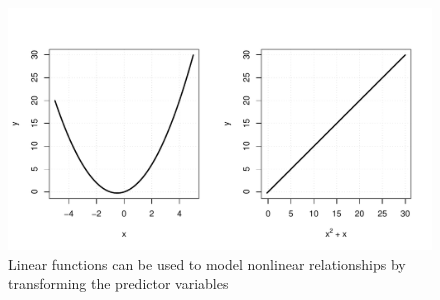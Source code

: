 \documentclass[11pt,a4paper,article]{memoir} %
\begin{document}
  \begin{figure}
  \includegraphics[width=\textwidth]{nonlinear_to_linear.pdf}
  \caption{Linear functions can be used to model nonlinear relationships by transforming the predictor variables}
  \label{fig:nonlinear_to_linear}
  \end{figure}
  
\end{document}
